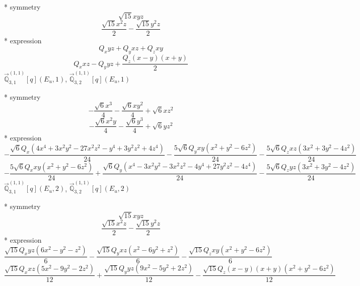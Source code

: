 \documentclass[fleqn,8pt]{jsarticle}
\begin{document}
\noindent\quad ** symmetry
\begin{dmath*}
\sqrt{15} x y z
\end{dmath*}
\begin{dmath*}
\frac{\sqrt{15} x^{2} z}{2} - \frac{\sqrt{15} y^{2} z}{2}
\end{dmath*}
\noindent\quad ** expression
\begin{dmath*}
Q_{x} y z + Q_{y} x z + Q_{z} x y
\end{dmath*}
\begin{dmath*}
Q_{x} x z - Q_{y} y z + \frac{Q_{z} \left(x - y\right) \left(x + y\right)}{2}
\end{dmath*}
\noindent\quad $\vec{\mathbb{Q}}_{3,1}^{(1,1)}[q](E_{u},1)$, $\vec{\mathbb{Q}}_{3,2}^{(1,1)}[q](E_{u},1)$

\noindent\quad ** symmetry
\begin{dmath*}
- \frac{\sqrt{6} x^{3}}{4} - \frac{\sqrt{6} x y^{2}}{4} + \sqrt{6} x z^{2}
\end{dmath*}
\begin{dmath*}
- \frac{\sqrt{6} x^{2} y}{4} - \frac{\sqrt{6} y^{3}}{4} + \sqrt{6} y z^{2}
\end{dmath*}
\noindent\quad ** expression
\begin{dmath*}
- \frac{\sqrt{6} Q_{x} \left(4 x^{4} + 3 x^{2} y^{2} - 27 x^{2} z^{2} - y^{4} + 3 y^{2} z^{2} + 4 z^{4}\right)}{24} - \frac{5 \sqrt{6} Q_{y} x y \left(x^{2} + y^{2} - 6 z^{2}\right)}{24} - \frac{5 \sqrt{6} Q_{z} x z \left(3 x^{2} + 3 y^{2} - 4 z^{2}\right)}{24}
\end{dmath*}
\begin{dmath*}
- \frac{5 \sqrt{6} Q_{x} x y \left(x^{2} + y^{2} - 6 z^{2}\right)}{24} + \frac{\sqrt{6} Q_{y} \left(x^{4} - 3 x^{2} y^{2} - 3 x^{2} z^{2} - 4 y^{4} + 27 y^{2} z^{2} - 4 z^{4}\right)}{24} - \frac{5 \sqrt{6} Q_{z} y z \left(3 x^{2} + 3 y^{2} - 4 z^{2}\right)}{24}
\end{dmath*}
\noindent\quad $\vec{\mathbb{Q}}_{3,1}^{(1,1)}[q](E_{u},2)$, $\vec{\mathbb{Q}}_{3,2}^{(1,1)}[q](E_{u},2)$

\noindent\quad ** symmetry
\begin{dmath*}
\sqrt{15} x y z
\end{dmath*}
\begin{dmath*}
\frac{\sqrt{15} x^{2} z}{2} - \frac{\sqrt{15} y^{2} z}{2}
\end{dmath*}
\noindent\quad ** expression
\begin{dmath*}
\frac{\sqrt{15} Q_{x} y z \left(6 x^{2} - y^{2} - z^{2}\right)}{6} - \frac{\sqrt{15} Q_{y} x z \left(x^{2} - 6 y^{2} + z^{2}\right)}{6} - \frac{\sqrt{15} Q_{z} x y \left(x^{2} + y^{2} - 6 z^{2}\right)}{6}
\end{dmath*}
\begin{dmath*}
\frac{\sqrt{15} Q_{x} x z \left(5 x^{2} - 9 y^{2} - 2 z^{2}\right)}{12} + \frac{\sqrt{15} Q_{y} y z \left(9 x^{2} - 5 y^{2} + 2 z^{2}\right)}{12} - \frac{\sqrt{15} Q_{z} \left(x - y\right) \left(x + y\right) \left(x^{2} + y^{2} - 6 z^{2}\right)}{12}
\end{dmath*}
\end{document}
